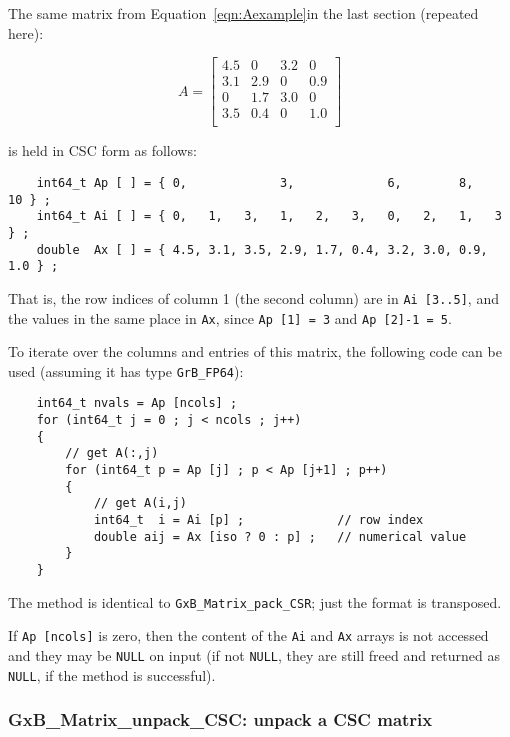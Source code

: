 \documentclass[12pt]{article}
\begin{document}
{The same matrix from Equation~\ref{eqn:Aexample}in
the last section (repeated here):

    \begin{equation}
    A = \left[
    \begin{array}{cccc}
    4.5 &   0 & 3.2 &   0 \\
    3.1 & 2.9 &  0  & 0.9 \\
     0  & 1.7 & 3.0 &   0 \\
    3.5 & 0.4 &  0  & 1.0 \\
    \end{array}
    \right]
    \end{equation}

is held in CSC form as follows:

{\footnotesize
\begin{verbatim}
    int64_t Ap [ ] = { 0,             3,             6,        8,       10 } ;
    int64_t Ai [ ] = { 0,   1,   3,   1,   2,   3,   0,   2,   1,   3   } ;
    double  Ax [ ] = { 4.5, 3.1, 3.5, 2.9, 1.7, 0.4, 3.2, 3.0, 0.9, 1.0 } ; \end{verbatim} }

That is, the row indices of column 1 (the second column) are in
\verb'Ai [3..5]', and the values in the same place in \verb'Ax',
since \verb'Ap [1] = 3' and \verb'Ap [2]-1 = 5'.

To iterate over the columns and entries of this matrix, the following code can
be used
(assuming it has type \verb'GrB_FP64'):

    {\footnotesize
    \begin{verbatim}
    int64_t nvals = Ap [ncols] ;
    for (int64_t j = 0 ; j < ncols ; j++)
    {
        // get A(:,j)
        for (int64_t p = Ap [j] ; p < Ap [j+1] ; p++)
        {
            // get A(i,j)
            int64_t  i = Ai [p] ;             // row index
            double aij = Ax [iso ? 0 : p] ;   // numerical value
        }
    } \end{verbatim}}

The method is identical to \verb'GxB_Matrix_pack_CSR'; just the format is
transposed.

If \verb'Ap [ncols]' is zero, then the content of the \verb'Ai' and \verb'Ax' arrays
is not accessed and they may be \verb'NULL' on input (if not \verb'NULL', they
are still freed and returned as \verb'NULL', if the method is successful).

\newpage
\subsubsection{{\sf GxB\_Matrix\_unpack\_CSC:} unpack a CSC matrix}
\label{matrix_unpack_csc}

}
\end{document}
